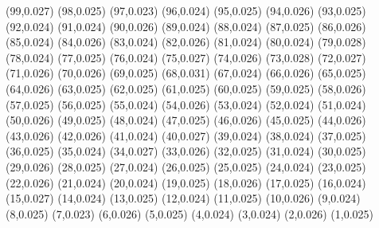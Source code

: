(99,0.027)
(98,0.025)
(97,0.023)
(96,0.024)
(95,0.025)
(94,0.026)
(93,0.025)
(92,0.024)
(91,0.024)
(90,0.026)
(89,0.024)
(88,0.024)
(87,0.025)
(86,0.026)
(85,0.024)
(84,0.026)
(83,0.024)
(82,0.026)
(81,0.024)
(80,0.024)
(79,0.028)
(78,0.024)
(77,0.025)
(76,0.024)
(75,0.027)
(74,0.026)
(73,0.028)
(72,0.027)
(71,0.026)
(70,0.026)
(69,0.025)
(68,0.031)
(67,0.024)
(66,0.026)
(65,0.025)
(64,0.026)
(63,0.025)
(62,0.025)
(61,0.025)
(60,0.025)
(59,0.025)
(58,0.026)
(57,0.025)
(56,0.025)
(55,0.024)
(54,0.026)
(53,0.024)
(52,0.024)
(51,0.024)
(50,0.026)
(49,0.025)
(48,0.024)
(47,0.025)
(46,0.026)
(45,0.025)
(44,0.026)
(43,0.026)
(42,0.026)
(41,0.024)
(40,0.027)
(39,0.024)
(38,0.024)
(37,0.025)
(36,0.025)
(35,0.024)
(34,0.027)
(33,0.026)
(32,0.025)
(31,0.024)
(30,0.025)
(29,0.026)
(28,0.025)
(27,0.024)
(26,0.025)
(25,0.025)
(24,0.024)
(23,0.025)
(22,0.026)
(21,0.024)
(20,0.024)
(19,0.025)
(18,0.026)
(17,0.025)
(16,0.024)
(15,0.027)
(14,0.024)
(13,0.025)
(12,0.024)
(11,0.025)
(10,0.026)
(9,0.024)
(8,0.025)
(7,0.023)
(6,0.026)
(5,0.025)
(4,0.024)
(3,0.024)
(2,0.026)
(1,0.025)
